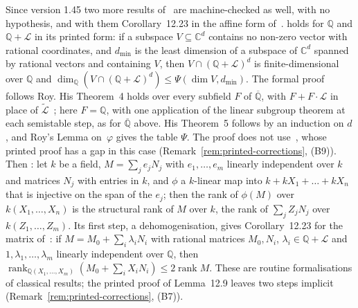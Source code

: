 \documentclass[11pt,a4paper]{article}
\theoremstyle{plain}
\theoremstyle{definition}
\newcommand{\C}{\mathbb{C}}
\newcommand{\Q}{\mathbb{Q}}
\newcommand{\Alg}{\overline{\mathbb{Q}}}
\newcommand{\Logs}{\mathcal{L}}
\newcommand{\aLogs}{\widetilde{\mathcal{L}}}
\begin{document}
Since version 1.45 two more results of~\cite{waldschmidt-book} are machine-checked as well, with no hypothesis, and
with them Corollary~12.23 in the affine form of~\cite[p.~435]{waldschmidt-book}.
\cite[Corollary~11.15]{waldschmidt-book} holds for $\Q$ and $\Q+\Logs$ in its printed form: if a subspace
$V\subseteq\C^{d}$ contains no non-zero vector with rational coordinates, and $d_{\min}$ is the least dimension of a
subspace of $\C^{d}$ spanned by rational vectors and containing $V$, then $V\cap(\Q+\Logs)^{d}$ is finite-dimensional
over $\Q$ and $\dim_{\Q}(V\cap(\Q+\Logs)^{d})\leq\Psi(\dim V,d_{\min})$. The formal proof follows Roy. His
Theorem~4 holds over every subfield $F$ of $\Alg$, with $F+F\cdot\Logs$ in place of
$\aLogs$~\cite[Remark~(i), p.~37]{roy-1992}; here $F=\Q$, with one application of the linear subgroup theorem at
each semistable step, as for $\Alg$ above. His Theorem~5 follows by an induction on $d$, and Roy's Lemma
on~$\varphi$ gives the table $\Psi$. The proof does not use~\cite[Proposition~11.19]{waldschmidt-book}, whose
printed proof has a gap in this case (Remark~\ref{rem:printed-corrections}, (B9)). Then
\cite[Lemma~12.9]{waldschmidt-book}: let $k$ be a field, $M=\sum_{j}e_{j}N_{j}$ with $e_{1},\dots,e_{m}$ linearly
independent over $k$ and matrices $N_{j}$ with entries in $k$, and $\phi$ a $k$-linear map into
$k+kX_{1}+\dots+kX_{n}$ that is injective on the span of the $e_{j}$; then the rank of $\phi(M)$ over
$k(X_{1},\dots,X_{n})$ is the structural rank of $M$ over $k$, the rank of $\sum_{j}Z_{j}N_{j}$ over
$k(Z_{1},\dots,Z_{m})$. Its first step, a dehomogenisation, gives Corollary~12.23 for the matrix
of~\cite[p.~435]{waldschmidt-book}: if $M=M_{0}+\sum_{i}\lambda_{i}N_{i}$ with rational matrices $M_{0},N_{i}$,
$\lambda_{i}\in\Q+\Logs$ and $1,\lambda_{1},\dots,\lambda_{m}$ linearly independent over $\Q$, then
$\operatorname{rank}_{\Q(X_{1},\dots,X_{m})}(M_{0}+\sum_{i}X_{i}N_{i})\leq2\operatorname{rank}M$. These are routine
formalisations of classical results; the printed proof of Lemma~12.9 leaves two steps implicit
(Remark~\ref{rem:printed-corrections}, (B7)).
\end{document}
